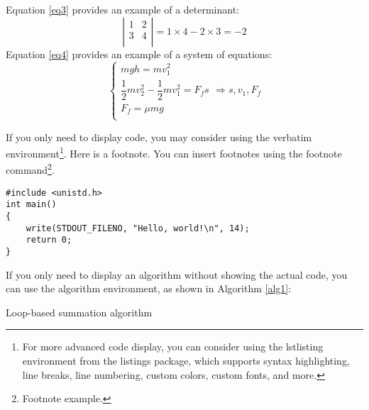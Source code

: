 \documentclass{xmu}
\begin{document}
Equation \ref{eq3} provides an example of a determinant:
\begin{equation}\label{eq3}
    \left|\begin{array}{cc}
        1 & 2 \\
        3 & 4 \\
    \end{array}\right|=1\times4-2\times3=-2
\end{equation}
Equation \ref{eq4} provides an example of a system of equations:
\begin{equation}\label{eq4}
    \begin{cases}
        mgh=mv_1^2                         \\
        \dfrac12mv_2^2-\dfrac12mv_1^2=F_fs \\
        F_f=\mu mg                         \\
    \end{cases} \Rightarrow s,v_1,F_f
\end{equation}

If you only need to display code, you may consider using the verbatim environment\footnote{For more advanced code display, you can consider using the lstlisting environment from the listings package, which supports syntax highlighting, line breaks, line numbering, custom colors, custom fonts, and more.}.
Here is a footnote. You can insert footnotes using the footnote command\footnote{Footnote example.}.
\begin{verbatim}
#include <unistd.h>
int main()
{
    write(STDOUT_FILENO, "Hello, world!\n", 14);
    return 0;
}
\end{verbatim}
If you only need to display an algorithm without showing the actual code, you can use the algorithm environment, as shown in Algorithm \ref{alg1}:
\begin{algorithm}[!htb]
    \caption{Loop-based summation algorithm}\label{alg1}
\end{algorithm}


\begin{reference}
    \printbibliography[title=References]
\end{reference}
\end{document}
